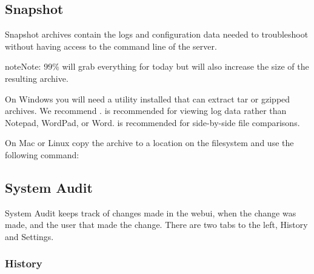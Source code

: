 \documentclass[letterpaper,10pt,english]{sphinxmanual}
\begin{document}
\subsection{Snapshot}
\label{\detokenize{webui:snapshot}}\label{\detokenize{webui:diagnostics-snapshot}}
Snapshot archives contain the logs and configuration data needed to troubleshoot without having access to the command line of the server.
\begin{quote}

\end{quote}

\begin{sphinxadmonition}{note}{Note:}
 99\% will grab everything for today but will also increase the size of the resulting archive.
\end{sphinxadmonition}

On Windows you will need a utility installed that can extract tar or gzipped archives. We recommend  .
 is recommended for viewing log data rather than Notepad, WordPad, or Word.
 is recommended for side-by-side file comparisons.

On Mac or Linux  copy the archive to a location on the filesystem and use the following command:

\begin{sphinxVerbatim}[commandchars=\\\{\}]
  
\end{sphinxVerbatim}


\subsection{System Audit}
\label{\detokenize{webui:system-audit}}\label{\detokenize{webui:diagnostics-system-audit}}
System Audit keeps track of changes made in the webui, when the change was made, and the user that made the change. There are two tabs to the left, History and Settings.


\subsubsection{History}
\label{\detokenize{webui:id61}}\begin{quote}

\end{quote}
\end{document}

